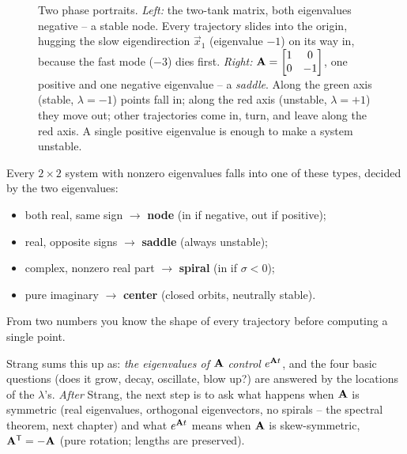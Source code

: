 \begin{figure}[H]
\caption{Two phase portraits. \emph{Left:} the two-tank matrix, both eigenvalues negative -- a stable
node. Every trajectory slides into the origin, hugging the slow eigendirection
$\vec{x}_1$ (eigenvalue $-1$) on its way in, because the fast mode ($-3$) dies
first. \emph{Right:} $\mathbf{A}=\protect\begin{bmatrix}1&0\\0&-1\protect\end{bmatrix}$,
one positive and one negative eigenvalue -- a \emph{saddle}.
Along the green axis (stable, $\lambda=-1$) points fall in; along the red axis
(unstable, $\lambda=+1$) they move out; other trajectories come in, turn, and
leave along the red axis. A single positive eigenvalue is enough to make a system unstable.}
\label{ch25:fig-node-saddle}
\end{figure}

\begin{intuitionbox}
Every $2\times2$ system with nonzero eigenvalues falls into one of these types,
decided by the two eigenvalues:
\begin{itemize}
  \item both real, same sign $\to$ \textbf{node} (in if negative, out if positive);
  \item real, opposite signs $\to$ \textbf{saddle} (always unstable);
  \item complex, nonzero real part $\to$ \textbf{spiral} (in if $\sigma<0$);
  \item pure imaginary $\to$ \textbf{center} (closed orbits, neutrally stable).
\end{itemize}
From two numbers you know the shape of every
trajectory before computing a single point.
\end{intuitionbox}

\begin{strangbox}
Strang sums this up as: \emph{the eigenvalues of $\mathbf{A}$ control
$e^{\mathbf{A}t}$}, and the four basic questions (does it grow, decay,
oscillate, blow up?) are answered by the locations of the $\lambda$'s. \emph{After}
Strang, the next step is to ask what happens when $\mathbf{A}$ is symmetric
(real eigenvalues, orthogonal eigenvectors, no spirals -- the spectral theorem,
next chapter) and what $e^{\mathbf{A}t}$ means when $\mathbf{A}$ is skew-symmetric,
$\mathbf{A}^{\mathsf{T}}=-\mathbf{A}$ (pure rotation; lengths are preserved).
\end{strangbox}

